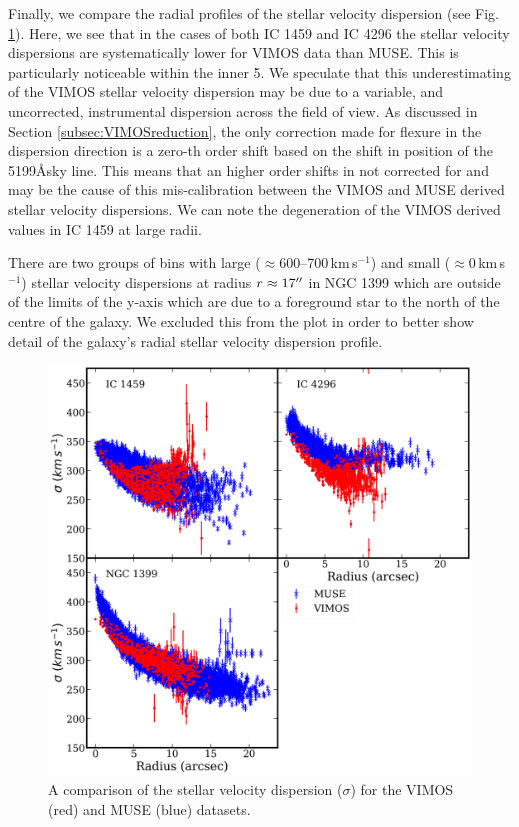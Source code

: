 			Finally, we compare the radial profiles of the stellar velocity dispersion (see Fig.\,\ref{fig:compare_sigprofile}). Here, we see that in the cases of both IC 1459 and IC 4296 the stellar velocity dispersions are systematically lower for VIMOS data than MUSE. This is particularly noticeable within the inner 5\arcsec. We speculate that this underestimating of the VIMOS stellar velocity dispersion may be due to a variable, and uncorrected, instrumental dispersion across the field of view. As discussed in Section \ref{subsec:VIMOSreduction}, the only correction made for flexure in the dispersion direction is a zero-th order shift based on the shift in position of the 5199\AA sky line. This means that an higher order shifts in not corrected for and may be the cause of this mis-calibration between the VIMOS and MUSE derived stellar velocity dispersions. We can note the degeneration of the VIMOS derived values in IC 1459 at large radii. 


			There are two groups of bins with large ($\approx$600--700\,km\,s$^{-1}$) and small ($\approx 0$\,km\,s$^{-1}$) stellar velocity dispersions at radius $r \approx 17\hbox{$^{\prime\prime}$}$ in NGC 1399 which are outside of the limits of the y-axis which are due to a foreground star to the north of the centre of the galaxy. We excluded this from the plot in order to better show detail of the galaxy's radial stellar velocity dispersion profile.


			\begin{figure}[t!]
				\centering
				\includegraphics[width=.9\textwidth]{chapter4/compare_sigma.png}
				\caption[Comparison between stellar velocity dispersion radial profiles from VIMOS and MUSE datacubes]{A comparison of the stellar velocity dispersion ($\sigma$) for the VIMOS (red) and MUSE (blue) datasets.}
				\label{fig:compare_sigprofile}
			\end{figure}

